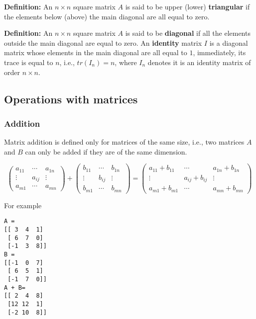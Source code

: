 \documentclass[11pt]{article}
\begin{document}
\textbf{Definition:} An \(n\times n\) square matrix \(A\) is said to be
upper (lower) \textbf{triangular} if the elements below (above) the main
diagonal are all equal to zero.

\textbf{Definition:} An \(n\times n\) square matrix \(A\) is said to be
\textbf{diagonal} if all the elements outside the main diagonal are
equal to zero. An \textbf{identity} matrix \(I\) is a diagonal matrix
whose elements in the main diagonal are all equal to \(1\), immediately,
its trace is equal to \(n\), i.e., \(tr(I_n) = n\), where \(I_n\)
denotes it is an identity matrix of order \(n\times n\).

\hypertarget{operations-with-matrices}{%
\subsection{Operations with matrices}\label{operations-with-matrices}}

\hypertarget{addition}{%
\subsubsection{Addition}\label{addition}}

Matrix addition is defined only for matrices of the same size, i.e., two
matrices \(A\) and \(B\) can only be added if they are of the same
dimension.

\[
\begin{pmatrix} a_{11} & \cdots & a_{1n} \\ \vdots & a_{ij} & \vdots \\ a_{m1} & \cdots & a_{mn} \end{pmatrix} + \begin{pmatrix} b_{11} & \cdots & b_{1n} \\ \vdots & b_{ij} & \vdots \\ b_{m1} & \cdots & b_{mn} \end{pmatrix} = \begin{pmatrix} a_{11} + b_{11} & \cdots & a_{1n} + b_{1n} \\ \vdots & a_{ij} + b_{ij} & \vdots \\ a_{m1} + b_{m1} & \cdots & a_{mn} + b_{mn} \end{pmatrix}
\]

For example

    \begin{Verbatim}[commandchars=\\\{\}]
A =
[[ 3  4  1]
 [ 6  7  0]
 [-1  3  8]]
B =
[[-1  0  7]
 [ 6  5  1]
 [-1  7  0]]
A + B=
[[ 2  4  8]
 [12 12  1]
 [-2 10  8]]
\end{Verbatim}
\end{document}
